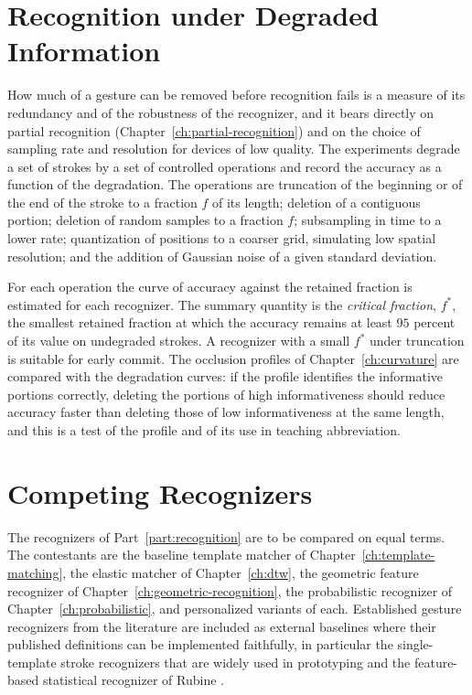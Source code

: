 \chapter{Recognition under Degraded Information}\label{ch:degraded}

How much of a gesture can be removed before recognition fails is a measure of its redundancy and of the robustness of the recognizer, and it bears directly on partial recognition (Chapter~\ref{ch:partial-recognition}) and on the choice of sampling rate and resolution for devices of low quality. The experiments degrade a set of strokes by a set of controlled operations and record the accuracy as a function of the degradation. The operations are truncation of the beginning or of the end of the stroke to a fraction $f$ of its length; deletion of a contiguous portion; deletion of random samples to a fraction $f$; subsampling in time to a lower rate; quantization of positions to a coarser grid, simulating low spatial resolution; and the addition of Gaussian noise of a given standard deviation.

For each operation the curve of accuracy against the retained fraction is estimated for each recognizer. The summary quantity is the \emph{critical fraction}, $f^{\ast}$, the smallest retained fraction at which the accuracy remains at least $95$ percent of its value on undegraded strokes. A recognizer with a small $f^{\ast}$ under truncation is suitable for early commit. The occlusion profiles of Chapter~\ref{ch:curvature} are compared with the degradation curves: if the profile identifies the informative portions correctly, deleting the portions of high informativeness should reduce accuracy faster than deleting those of low informativeness at the same length, and this is a test of the profile and of its use in teaching abbreviation.\evH

\chapter{Competing Recognizers}\label{ch:competing-recognizers}

The recognizers of Part~\ref{part:recognition} are to be compared on equal terms. The contestants are the baseline template matcher of Chapter~\ref{ch:template-matching}, the elastic matcher of Chapter~\ref{ch:dtw}, the geometric feature recognizer of Chapter~\ref{ch:geometric-recognition}, the probabilistic recognizer of Chapter~\ref{ch:probabilistic}, and personalized variants of each. Established gesture recognizers from the literature are included as external baselines where their published definitions can be implemented faithfully, in particular the single-template stroke recognizers that are widely used in prototyping \cite{wobbrock2007,vatavu2012} and the feature-based statistical recognizer of Rubine \cite{rubine1991}.\evD{}

